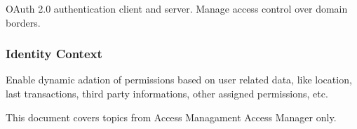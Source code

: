OAuth 2.0 authentication client and server. Manage access control over
domain borders.


\subsubsection{Identity Context}

Enable dynamic adation of permissions based on user related data, like
location, last transactions, third party informations, other assigned
permissions, etc.


This document covers topics from Access Managament Access Manager only.

